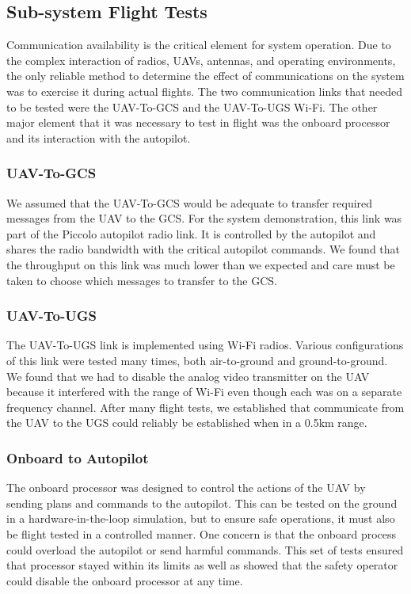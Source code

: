 \documentclass[letterpaper, 12 pt, conference]{ieeeconf}  %
\theoremstyle{definition}
\begin{document}
\subsection{Sub-system Flight Tests}
Communication availability is the critical element for system operation. Due to the complex interaction of radios, UAVs, antennas, and operating environments, the only reliable method to determine the effect of communications on the system was to exercise it during actual flights. The two communication links that needed to be tested were the UAV-To-GCS and the UAV-To-UGS Wi-Fi.  The other major element that it was necessary to test in flight was the onboard processor and its interaction with the autopilot.

\subsubsection{UAV-To-GCS}  We assumed that the UAV-To-GCS would be adequate to transfer required messages from the UAV to the GCS. For the system demonstration, this link was part of the Piccolo autopilot radio link. It is controlled by the autopilot and shares the radio bandwidth with the critical autopilot commands. We found that the throughput on this link was much lower than we expected and care must be taken to choose which messages to transfer to the GCS. 
\subsubsection{UAV-To-UGS} The UAV-To-UGS link is implemented using Wi-Fi radios. Various configurations of this link were tested many times, both air-to-ground and ground-to-ground. We found that we had to disable the analog video transmitter on the UAV because it interfered with the range of Wi-Fi even though each was on a separate frequency channel. After many flight tests, we established that communicate from the UAV to the UGS could reliably be established when in a 0.5km range.
\subsubsection{Onboard to Autopilot} The onboard processor was designed to control the actions of the UAV by sending plans and commands to the autopilot. This can be tested on the ground in a hardware-in-the-loop simulation, but to ensure safe operations, it must also be flight tested in a controlled manner. One concern is that the onboard process could overload the autopilot or send harmful commands. This set of tests ensured that processor stayed within its limits as well as showed that the safety operator could disable the onboard processor at any time.
\end{document}
